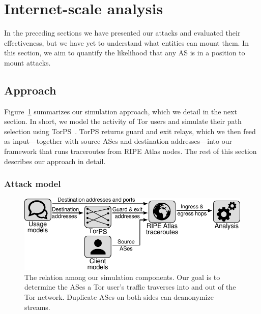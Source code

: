 \section{Internet-scale analysis}
\label{sec:internet-scale}

In the preceding sections we have presented our \name attacks and evaluated
their effectiveness, but we have yet to understand what entities can mount them.
In this section, we aim to quantify the likelihood that any AS is in a position
to mount \name attacks.

\subsection{Approach}

Figure~\ref{fig:simulations} summarizes our simulation approach, which we detail
in the next section.  In short, we model the activity of Tor users and simulate
their path selection using TorPS~\cite{TorPS}.  TorPS returns guard and exit
relays, which we then feed as input---together with source ASes and destination
addresses---into our framework that runs traceroutes from RIPE Atlas nodes.  The
rest of this section describes our approach in detail.

\subsubsection{Attack model}

\begin{figure}[t]
	\centering
	\includegraphics[width=\linewidth]{figures/simulations.pdf}
	\caption{The relation among our simulation components.  Our goal is to
	determine the ASes a Tor user's traffic traverses into and out of the Tor
	network.  Duplicate ASes on both sides can deanonymize streams.}
	\label{fig:simulations}
\end{figure}

